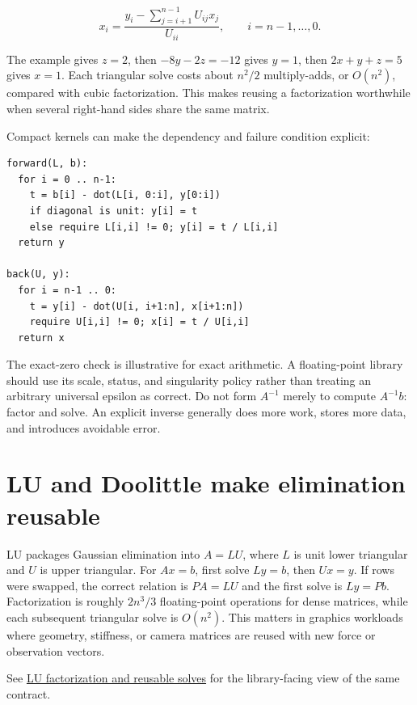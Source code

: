 \[
x_i=\frac{y_i-\sum_{j=i+1}^{n-1}U_{ij}x_j}{U_{ii}},\qquad i=n-1,\ldots,0.
\]

The example gives \(z=2\), then \(-8y-2z=-12\) gives \(y=1\), then \(2x+y+z=5\) gives \(x=1\). Each triangular solve costs about \(n^2/2\) multiply-adds, or \(O(n^2)\), compared with cubic factorization. This makes reusing a factorization worthwhile when several right-hand sides share the same matrix.

Compact kernels can make the dependency and failure condition explicit:

\begin{verbatim}
forward(L, b):
  for i = 0 .. n-1:
    t = b[i] - dot(L[i, 0:i], y[0:i])
    if diagonal is unit: y[i] = t
    else require L[i,i] != 0; y[i] = t / L[i,i]
  return y

back(U, y):
  for i = n-1 .. 0:
    t = y[i] - dot(U[i, i+1:n], x[i+1:n])
    require U[i,i] != 0; x[i] = t / U[i,i]
  return x
\end{verbatim}

The exact-zero check is illustrative for exact arithmetic. A floating-point library should use its scale, status, and singularity policy rather than treating an arbitrary universal epsilon as correct. Do not form \(A^{-1}\) merely to compute \(A^{-1}b\): factor and solve. An explicit inverse generally does more work, stores more data, and introduces avoidable error.

\section{LU and Doolittle make elimination reusable}\label{01-foundations-i-ch019-lu-and-doolittle-make-elimination-reusable}

LU packages Gaussian elimination into \(A=LU\), where \(L\) is unit lower triangular and \(U\) is upper triangular. For \(Ax=b\), first solve \(Ly=b\), then \(Ux=y\). If rows were swapped, the correct relation is \(PA=LU\) and the first solve is \(Ly=Pb\). Factorization is roughly \(2n^3/3\) floating-point operations for dense matrices, while each subsequent triangular solve is \(O(n^2)\). This matters in graphics workloads where geometry, stiffness, or camera matrices are reused with new force or observation vectors.

See \hyperref[01-foundations-i-ch019-a-runnable-pivoted-lu-reference-preserves-the-elimination-history]{LU factorization and reusable solves} for the library-facing view of the same contract.

